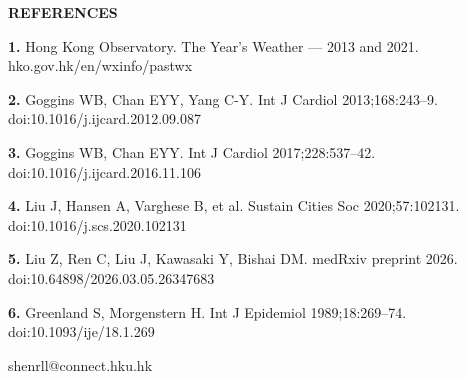 \documentclass[12pt]{article}
\begin{document}
\begin{tcolorbox}[enhanced,colback=Mist,colframe=Mist,boxrule=0pt,arc=1.5mm,
  left=7mm,right=7mm,top=3.5mm,bottom=3.5mm,width=\linewidth,
  before skip=0pt,after skip=0pt]
{\color{Navy}\bfseries\fontsize{22}{26}\selectfont REFERENCES\par}
\vspace{2mm}
\noindent\begin{minipage}[t]{0.32\linewidth}
{\color{Slate}\fontsize{17.5}{21.5}\selectfont\RaggedRight
\textbf{1.} Hong Kong Observatory. The Year's Weather --- 2013 and 2021.
hko.gov.hk/en/wxinfo/pastwx\par
\vspace{1.2mm}
\textbf{2.} Goggins WB, Chan EYY, Yang C-Y. Int J Cardiol 2013;168:243--9.
doi:10.1016/j.ijcard.2012.09.087\par}
\end{minipage}\hfill\begin{minipage}[t]{0.32\linewidth}
{\color{Slate}\fontsize{17.5}{21.5}\selectfont\RaggedRight
\textbf{3.} Goggins WB, Chan EYY. Int J Cardiol 2017;228:537--42.
doi:10.1016/j.ijcard.2016.11.106\par
\vspace{1.2mm}
\textbf{4.} Liu J, Hansen A, Varghese B, et al. Sustain Cities Soc
2020;57:102131. doi:10.1016/j.scs.2020.102131\par}
\end{minipage}\hfill\begin{minipage}[t]{0.32\linewidth}
{\color{Slate}\fontsize{17.5}{21.5}\selectfont\RaggedRight
\textbf{5.} Liu Z, Ren C, Liu J, Kawasaki Y, Bishai DM. medRxiv preprint 2026.
doi:10.64898/2026.03.05.26347683\par
\vspace{1.2mm}
\textbf{6.} Greenland S, Morgenstern H. Int J Epidemiol 1989;18:269--74.
doi:10.1093/ije/18.1.269\par}
\end{minipage}
\end{tcolorbox}
\vspace{2mm}
{\fontsize{17.5}{22}\selectfont\color{Slate}\hfill shenrll@connect.hku.hk\par}
\end{document}
